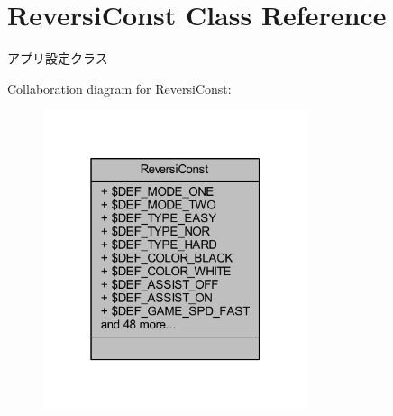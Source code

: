 \hypertarget{class_reversi_const}{}\section{Reversi\+Const Class Reference}
\label{class_reversi_const}


アプリ設定クラス  




Collaboration diagram for Reversi\+Const\+:\nopagebreak
\begin{figure}[H]
\begin{center}
\leavevmode
\includegraphics[width=220pt]{class_reversi_const__coll__graph}
\end{center}
\end{figure}
